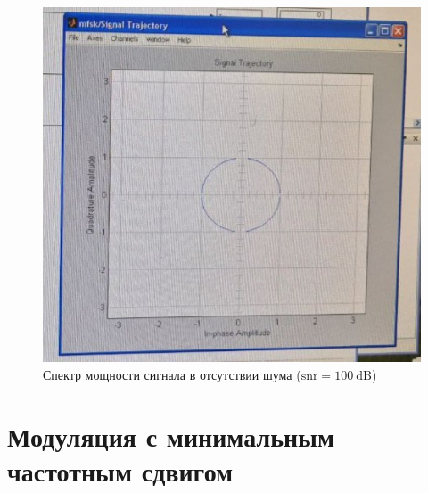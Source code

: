 \documentclass[14pt, a4paper]{article}
\begin{document}
\begin{figure}[H]
\centering
\includegraphics[width=.8\linewidth]{../images/rt2-9a}
\caption{Спектр мощности сигнала в отсутствии шума ($\text{snr}=100\ \text{dB}$)}
\end{figure}

\section{Модуляция с минимальным частотным сдвигом}
\end{document}
